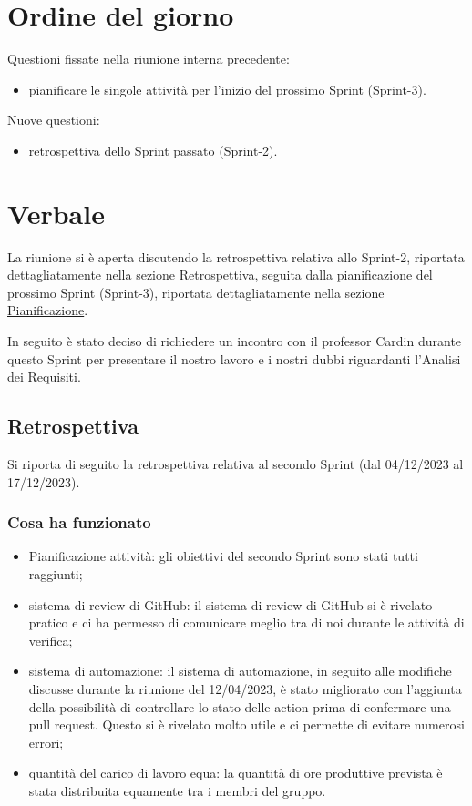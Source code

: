 \documentclass[12pt]{article}
\begin{document}
    \section{Ordine del giorno}
        Questioni fissate nella riunione interna precedente:
        \begin{itemize}
			\item pianificare le singole attività per l'inizio del prossimo Sprint (Sprint-3).
    	\end{itemize}
    	Nuove questioni:
    	\begin{itemize}
    		\item retrospettiva dello Sprint passato (Sprint-2).
    	\end{itemize}
    
    \section{Verbale}

	La riunione si è aperta discutendo la retrospettiva relativa allo Sprint-2, riportata dettagliatamente nella sezione \hyperref[sec:retrospettiva]{Retrospettiva}, seguita dalla pianificazione del prossimo Sprint (Sprint-3), riportata dettagliatamente nella sezione \hyperref[sec:pianificazione]{Pianificazione}.
	
	\vspace{0.3cm}
	\noindent
	In seguito è stato deciso di richiedere un incontro con il professor Cardin durante questo Sprint per presentare il nostro lavoro e i nostri dubbi riguardanti l'Analisi dei Requisiti.


	\subsection{Retrospettiva} \label{sec:retrospettiva}

	Si riporta di seguito la retrospettiva relativa al secondo Sprint (dal 04/12/2023 al 17/12/2023).

	\subsubsection{Cosa ha funzionato}
	\begin{itemize}
		\item Pianificazione attività: gli obiettivi del secondo Sprint sono stati tutti raggiunti;
		\item sistema di review di GitHub: il sistema di review di GitHub si è rivelato pratico e ci ha permesso di comunicare meglio tra di noi durante le attività di verifica;
		\item sistema di automazione: il sistema di automazione, in seguito alle modifiche discusse durante la riunione del 12/04/2023, è stato migliorato con l'aggiunta della possibilità di controllare lo stato delle action prima di confermare una pull request. Questo si è rivelato molto utile e ci permette di evitare numerosi errori;
		\item quantità del carico di lavoro equa: la quantità di ore produttive prevista è stata distribuita equamente tra i membri del gruppo.
	\end{itemize}
	
\end{document}
